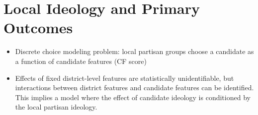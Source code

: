 \documentclass[12pt
              ]{article}
\begin{document}
\section{Local Ideology and Primary Outcomes}

\begin{itemize}
  \item Discrete choice modeling problem: local partisan groups choose a candidate as a function of candidate features (CF score)
  \item Effects of fixed district-level features are statistically unidentifiable, but interactions between district features and candidate features can be identified. This implies a model where the effect of candidate ideology is conditioned by the local partisan ideology.
\end{itemize}

\printbibliography
\end{document}
